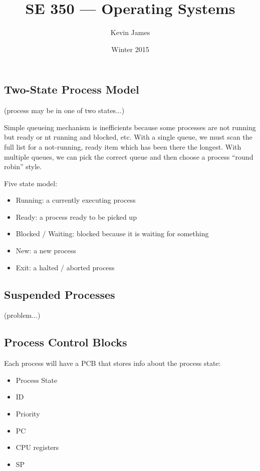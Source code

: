 \documentclass[12pt]{article}
\begin{document}
\title{SE 350 --- Operating Systems}
\author{Kevin James}
\date{\vspace{-2ex}Winter 2015}
\maketitle\HRule

\tableofcontents
\newpage

\subsection{Two-State Process Model}
(process may be in one of two states...)

Simple queueing mechanism is inefficients because some processes are not running but ready or nt running and blocked, etc. With a single queue, we must scan the full list for a not-running, ready item which has been there the longest. With multiple queues, we can pick the correct queue and then choose a process ``round robin'' style.

Five state model:
\begin{itemize}
\item Running: a currently executing process
\item Ready: a process ready to be picked up
\item Blocked / Waiting: blocked because it is waiting for something
\item New: a new process
\item Exit: a halted / aborted process
\end{itemize}

\subsection{Suspended Processes}
(problem...)

\subsection{Process Control Blocks}
Each process will have a PCB that stores info about the process state:
\begin{itemize}
\item Process State
\item ID
\item Priority
\item PC
\item CPU registers
\item SP
\end{itemize}
\end{document}
